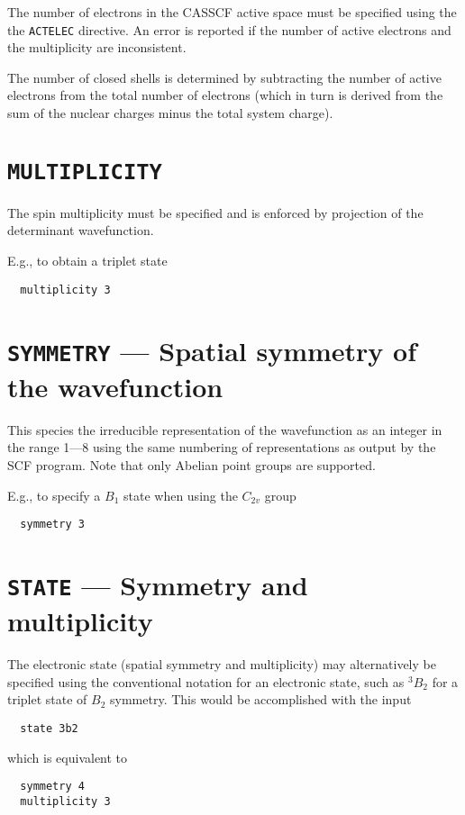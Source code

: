 The number of electrons in the CASSCF active space must be specified
using the the {\tt ACTELEC} directive.  An error is reported if the
number of active electrons and the multiplicity are inconsistent.

The number of closed shells is determined by subtracting the number
of active electrons from the total number of electrons (which in turn
is derived from the sum of the nuclear charges minus the total system
charge).

\section{{\tt MULTIPLICITY}}

The spin multiplicity must be specified and is enforced by projection
of the determinant wavefunction.

E.g., to obtain a triplet state
\begin{verbatim}
  multiplicity 3
\end{verbatim}

\section{{\tt SYMMETRY} --- Spatial symmetry of the wavefunction}

This species the irreducible representation of the wavefunction as an
integer in the range 1---8 using the same numbering of representations
as output by the SCF program.  Note that only Abelian point groups are
supported.

E.g., to specify a $B_1$ state when using the $C_{2v}$ group
\begin{verbatim}
  symmetry 3
\end{verbatim}

\section{{\tt STATE} --- Symmetry and multiplicity}

The electronic state (spatial symmetry and multiplicity) may
alternatively be specified using the conventional notation for an
electronic state, such as $^3B_2$ for a triplet state of $B_2$
symmetry.  This would be accomplished with the input
\begin{verbatim}
  state 3b2
\end{verbatim}
which is equivalent to 
\begin{verbatim}
  symmetry 4
  multiplicity 3
\end{verbatim}

